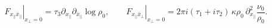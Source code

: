 \begin{equation}
\left.F_{x_{||}\bar x_{||}}\right|_{x_\perp=0}=
\tau_3\partial_{x_{||}}\partial_{\bar x_{||}}
\log\rho_0,~~~~~~~~~
\left.F_{x_{||}\bar x_\perp}\right|_{x_\perp=0}
=2\pi i(\tau_1+i\tau_2)\,
\kappa\rho_0\,\partial^2_{x_{||}}\frac{\nu_0}{\rho_0}. 
\end{equation}


